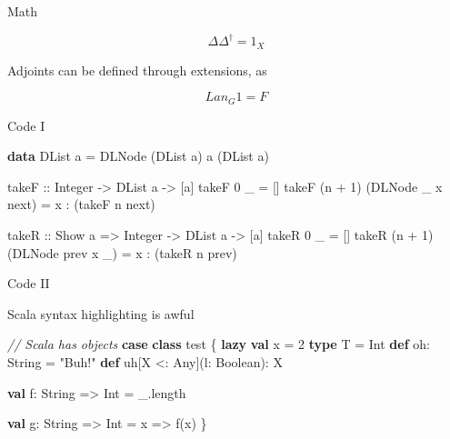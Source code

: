 \documentclass[10pt,compress]{beamer}
\makeatletter
\newenvironment{Shaded}{\vspace{\baselineskip}\begin{shaded}}{\end{shaded}\vspace{\baselineskip}}
\newcommand{\KeywordTok}[1]{\textbf{\textcolor{solarized@base00}{#1}}}
\newcommand{\DataTypeTok}[1]{\textcolor{solarized@blue}{#1}}
\newcommand{\DecValTok}[1]{\textcolor{solarized@violet}{#1}}
\newcommand{\StringTok}[1]{\textcolor{solarized@violet}{#1}}
\newcommand{\CommentTok}[1]{\textcolor{solarized@base1}{\textit{#1}}}
\newcommand{\OtherTok}[1]{\textcolor{solarized@green}{#1}}
\newcommand{\FunctionTok}[1]{\textcolor{solarized@base1}{#1}}
\newcommand{\NormalTok}[1]{\textcolor{solarized@base00}{#1}}
\makeatother
\begin{document}
\begin{frame}{Math}

\[
  \Delta \Delta^\dagger = 1_X
\]

Adjoints can be defined through extensions, as

\[
  Lan_G 1 = F
\]

\end{frame}

\begin{frame}[fragile]{Code I}

\begin{Shaded}
\begin{Highlighting}[]
\KeywordTok{data} \DataTypeTok{DList} \NormalTok{a }\FunctionTok{=} \DataTypeTok{DLNode} \NormalTok{(}\DataTypeTok{DList} \NormalTok{a) a (}\DataTypeTok{DList} \NormalTok{a)}

\OtherTok{takeF ::} \DataTypeTok{Integer} \OtherTok{->} \DataTypeTok{DList} \NormalTok{a }\OtherTok{->} \NormalTok{[a]}
\NormalTok{takeF }\DecValTok{0}     \NormalTok{_                   }\FunctionTok{=} \NormalTok{[]}
\NormalTok{takeF (n }\FunctionTok{+} \DecValTok{1}\NormalTok{) (}\DataTypeTok{DLNode} \NormalTok{_ x next) }\FunctionTok{=} \NormalTok{x }\FunctionTok{:} \NormalTok{(takeF n next)}

\OtherTok{takeR ::} \DataTypeTok{Show} \NormalTok{a }\OtherTok{=>} \DataTypeTok{Integer} \OtherTok{->} \DataTypeTok{DList} \NormalTok{a }\OtherTok{->} \NormalTok{[a]}
\NormalTok{takeR }\DecValTok{0}     \NormalTok{_                   }\FunctionTok{=} \NormalTok{[]}
\NormalTok{takeR (n }\FunctionTok{+} \DecValTok{1}\NormalTok{) (}\DataTypeTok{DLNode} \NormalTok{prev x _) }\FunctionTok{=} \NormalTok{x }\FunctionTok{:} \NormalTok{(takeR n prev)}
\end{Highlighting}
\end{Shaded}

\end{frame}

\begin{frame}[fragile]{Code II}

Scala syntax highlighting is awful

\begin{Shaded}
\begin{Highlighting}[]
\CommentTok{// Scala has objects}
\KeywordTok{case} \KeywordTok{class} \NormalTok{test \{}
  \KeywordTok{lazy} \KeywordTok{val} \NormalTok{x = }\DecValTok{2}
  \KeywordTok{type} \NormalTok{T = Int}
  \KeywordTok{def} \NormalTok{oh: String = }\StringTok{"Buh!"}
  \KeywordTok{def} \NormalTok{uh[X <: Any](l: Boolean): X}

  \KeywordTok{val} \NormalTok{f: String => Int = _.}\FunctionTok{length}

  \KeywordTok{val} \NormalTok{g: String => Int = x => }\FunctionTok{f}\NormalTok{(x)}
\NormalTok{\}}
\end{Highlighting}
\end{Shaded}

\end{frame}
\end{document}
